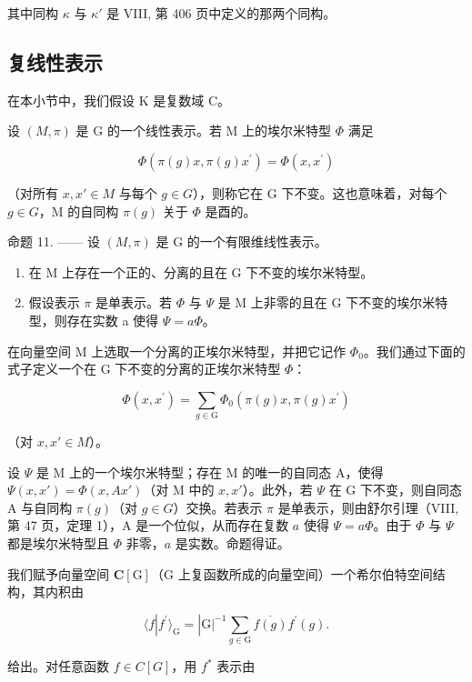其中同构 \(\kappa\) 与 \(\kappa'\) 是 VIII, 第 406 页中定义的那两个同构。

\subsection{复线性表示}

在本小节中，我们假设 K 是复数域 C。

设 \((M,\pi)\) 是 G 的一个线性表示。若 M 上的埃尔米特型 \(\Phi\) 满足

\[
\Phi (\pi (g) x, \pi (g) x ^ {\prime}) = \Phi (x, x ^ {\prime})\tag{48}
\]

（对所有 \(x, x' \in M\) 与每个 \(g \in G\)），则称它在 G 下不变。这也意味着，对每个 \(g \in G\)，M 的自同构 \(\pi(g)\) 关于 \(\Phi\) 是酉的。

命题 11. —— 设 \((M,\pi)\) 是 G 的一个有限维线性表示。

\begin{enumerate}
\def\labelenumi{\alph{enumi})}
\item
  在 M 上存在一个正的、分离的且在 G 下不变的埃尔米特型。
\item
  假设表示 \(\pi\) 是单表示。若 \(\Phi\) 与 \(\Psi\) 是 M 上非零的且在 G 下不变的埃尔米特型，则存在实数 a 使得 \(\Psi = a\Phi\)。
\end{enumerate}

在向量空间 M 上选取一个分离的正埃尔米特型，并把它记作 \(\Phi_{0}\)。我们通过下面的式子定义一个在 G 下不变的分离的正埃尔米特型 \(\Phi\)：

\[
\Phi (x, x ^ {\prime}) = \sum_ {g \in \mathrm{G}} \Phi_ {0} (\pi (g) x, \pi (g) x ^ {\prime})\tag{49}
\]

（对 \(x, x' \in M\)）。

设 \(\Psi\) 是 M 上的一个埃尔米特型；存在 M 的唯一的自同态 A，使得 \(\Psi(x, x') = \Phi(x, Ax')\)（对 M 中的 \(x, x'\)）。此外，若 \(\Psi\) 在 G 下不变，则自同态 A 与自同构 \(\pi(g)\)（对 \(g \in G\)）交换。若表示 \(\pi\) 是单表示，则由舒尔引理（VIII, 第 47 页，定理 1），A 是一个位似，从而存在复数 \(a\) 使得 \(\Psi = a\Phi\)。由于 \(\Phi\) 与 \(\Psi\) 都是埃尔米特型且 \(\Phi\) 非零，\(a\) 是实数。命题得证。

我们赋予向量空间 \(\mathbf{C}[\mathrm{G}]\)（\(\mathrm{G}\) 上复函数所成的向量空间）一个希尔伯特空间结构，其内积由

\[
\langle f | f ^ {\prime} \rangle_ {\mathrm{G}} = | \mathrm{G} | ^ {- 1} \sum_ {g \in \mathrm{G}} \overline {{f (g)}} f ^ {\prime} (g).\tag{50}
\]

给出。对任意函数 \(f \in C[G]\)，用 \(f^{*}\) 表示由

